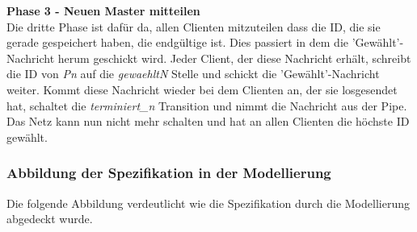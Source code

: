 \textbf{Phase 3 - Neuen Master mitteilen}\\
Die dritte Phase ist dafür da, allen Clienten mitzuteilen dass die ID, die sie gerade gespeichert haben, die endgültige ist. Dies passiert in dem die 'Gewählt'-Nachricht herum geschickt wird. Jeder Client, der diese Nachricht erhält, schreibt die ID von \textit{Pn} auf die \textit{gewaehltN} Stelle und schickt die 'Gewählt'-Nachricht weiter. Kommt diese Nachricht wieder bei dem Clienten an, der sie losgesendet hat, schaltet die \textit{terminiert\_n} Transition und nimmt die Nachricht aus der Pipe. Das Netz kann nun nicht mehr schalten und hat an allen Clienten die höchste ID gewählt.

\subsubsection{Abbildung der Spezifikation in der Modellierung} \label{Spezi-Modell}

Die folgende Abbildung verdeutlicht wie die Spezifikation durch die Modellierung abgedeckt wurde.

